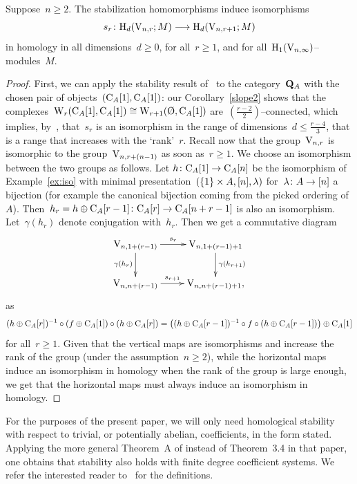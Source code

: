 \begin{theorem}\label{thm:HS}
Suppose~$n\ge 2$. The stabilization homomorphisms induce isomorphisms
\[
s_r\colon \mathrm{H}_d(\mathrm{V}_{n,r};M)\longrightarrow\mathrm{H}_d(\mathrm{V}_{n,r+1};M)
\]
in homology in all dimensions~$d\geqslant0$, for all~$r\geqslant 1$, and for all~$\mathrm{H}_1(\mathrm{V}_{n,\infty})$--modules~$M$.
\end{theorem}

\begin{proof}
First, we can apply the stability result of~\cite{Randal-Williams+Wahl} to the category~$\mathbf{Q}_A$ with the chosen pair of objects~$(\mathrm{C}_A[1],\mathrm{C}_A[1])$: our Corollary~\ref{slope2} shows that the complexes~\hbox{$\rmW_r(\rmC_A[1],\rmC_A[1])\cong\rmW_{r+1}(\emptyset,\rmC_A[1])$} are~$(\frac{r-2}{2})$--connected, which implies, by~\cite[Thm.~3.4]{Randal-Williams+Wahl}, that~$s_r$ is an isomorphism in the range of dimensions~$d\leqslant \frac{r-4}{3}$, that is a range that increases with the `rank'~$r$. Recall now that the group~$\mathrm{V}_{n,r}$ is isomorphic to the group~$\mathrm{V}_{n,r+(n-1)}$ as soon as~\hbox{$r\geqslant 1$}. We choose an isomorphism between the two groups as follows. Let 
$h\colon \mathrm{C}_A[1]\to \mathrm{C}_A[n]$ be the isomorphism of Example~\ref{ex:iso} with minimal presentation~$(\{1\}\times A,[n],\lambda)$ for~$\lambda\colon A\to [n]$ a bijection (for example the canonical bijection coming from the picked ordering of~$A$). Then~$h_r=h\oplus \mathrm{C}_A[r-1]\colon \mathrm{C}_A[r]\to \mathrm{C}_A[n+r-1]$ is also an isomorphism. 
Let~$\gamma(h_r)$ denote conjugation with~$h_r$. Then we get a commutative diagram 
\[
\xymatrix{\rmV_{n,1+(r-1)}\ar[r]^-{s_r}\ar[d]_{\gamma(h_r)} &\rmV_{n,1+(r-1)+1}\ar[d]^{\gamma(h_{r+1})}\\
\rmV_{n,n+(r-1)}\ar[r]^-{s_{r+1}} &\rmV_{n,n+(r-1)+1}, 
}
\]
as
\[
(h\oplus \mathrm{C}_A[r])^{-1}\circ (f\oplus \mathrm{C}_A[1])\circ (h\oplus \mathrm{C}_A[r])=\big((h\oplus \mathrm{C}_A[r-1])^{-1}\circ f\circ (h\oplus \mathrm{C}_A[r-1])\big)\oplus \mathrm{C}_A[1]
\]
for all~$r\geqslant 1$. 
Given that the vertical maps are isomorphisms and increase the rank of the group (under the assumption~\hbox{$n\ge 2$}), 
while the horizontal maps induce an isomorphism in homology when the rank of the group is large enough,
we get that the horizontal maps must always induce an isomorphism in homology. 
\end{proof}



\begin{remark}
For the purposes of the present paper, we will only need homological stability with respect to trivial, or potentially abelian, coefficients, in the form  stated. 
Applying the more general Theorem~A of \cite{Randal-Williams+Wahl} instead of Theorem~3.4 in that paper, one obtains that stability also holds with finite degree coefficient systems. 
We refer the interested reader to~\cite{Randal-Williams+Wahl} for the definitions. %
\end{remark}

